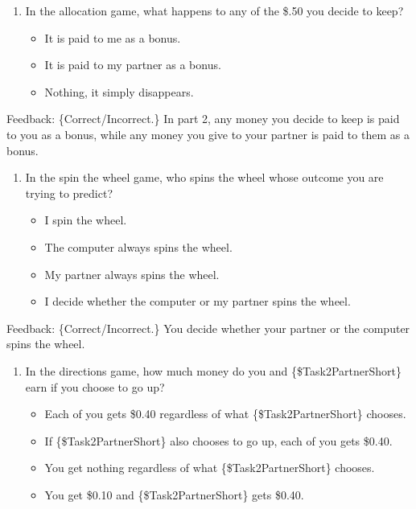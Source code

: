 \begin{description}[listparindent = 1.5em]
    \item[Part 2 Quiz Question 2] \hspace{1cm}
    \begin{enumerate} 
        \item In the allocation game, what happens to any of the \$.50 you decide to keep?
        \begin{itemize}
            \item It is paid to me as a bonus.
            \item It is paid to my partner as a bonus.
            \item Nothing, it simply disappears.            
        \end{itemize}
    \end{enumerate}

    Feedback: \{Correct/Incorrect.\} In part 2, any money you decide to keep
    is paid to you as a bonus, while any money you give to your partner is paid
    to them as a bonus.

    \item[Part 2 Quiz Question 3] \hspace{1cm}
    \begin{enumerate} 
        \item In the spin the wheel game, who spins the wheel whose outcome you are trying to predict?
        \begin{itemize}
            \item I spin the wheel.
            \item The computer always spins the wheel.
            \item My partner always spins the wheel.
            \item I decide whether the computer or my partner spins the wheel.                   
        \end{itemize}
    \end{enumerate}

    Feedback: \{Correct/Incorrect.\} You decide whether your partner or the
        computer spins the wheel.

    \item[Part 2 Quiz Question 4] \hspace{1cm}
    \begin{enumerate}
        \item In the directions game, how much money do you and
        \{\$Task2PartnerShort\} earn if you choose to go up?
        \begin{itemize}
            \item Each of you gets \$0.40 regardless of what \{\$Task2PartnerShort\} chooses. 
            \item If \{\$Task2PartnerShort\} also chooses to go up, each of you gets \$0.40. 
            \item You get nothing regardless of what \{\$Task2PartnerShort\} chooses.
            \item You get \$0.10 and \{\$Task2PartnerShort\} gets \$0.40.                      
        \end{itemize}
    \end{enumerate}


\end{description}
